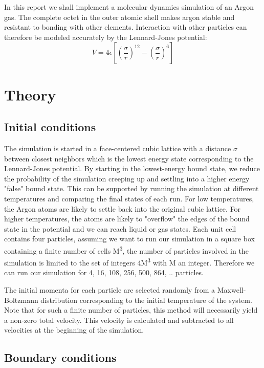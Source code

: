 \documentclass[10pt,letterpaper]{article}
\begin{document}
In this report we shall implement a molecular dynamics simulation of an Argon gas. The complete  octet in the outer atomic shell makes argon stable and resistant to bonding with other elements. Interaction with other particles can therefore be modeled accurately by the Lennard-Jones potential: 
\begin{equation}
V = 4{\epsilon}[(\frac{\sigma}{r})^{12} - (\frac{\sigma}{r})^6]
\end{equation}



\section{Theory}

\subsection{Initial conditions}

The simulation is started in a face-centered cubic lattice with a distance $\sigma$ between closest neighbors which is the lowest energy state corresponding to the Lennard-Jones potential. By starting in the lowest-energy bound state, we reduce the probability of the simulation creeping up and settling into a higher energy "false" bound state. This can be supported by running the simulation at different temperatures and comparing the final states of each run. For low temperatures, the Argon atoms are likely to settle back into the original cubic lattice. For higher temperatures, the atoms are likely to "overflow" the edges of the bound state in the potential  and we can reach liquid or gas states. Each unit cell contains four particles, assuming we want to run our simulation in a square box containing a finite number of cells M\textsuperscript{3}, the number of particles involved in the simulation is limited to the set of integers 4M\textsuperscript{3} with M an integer. Therefore we can run our simulation for 4, 16, 108, 256, 500, 864, .. particles.
\vspace{5mm}

The initial momenta for each particle are selected randomly from a Maxwell-Boltzmann distribution corresponding to the initial temperature of the system. Note that for such a finite number of particles, this method will necessarily yield a non-zero total velocity. This velocity is calculated and subtracted to all velocities at the beginning of the simulation.

\subsection{Boundary conditions}
\end{document}
